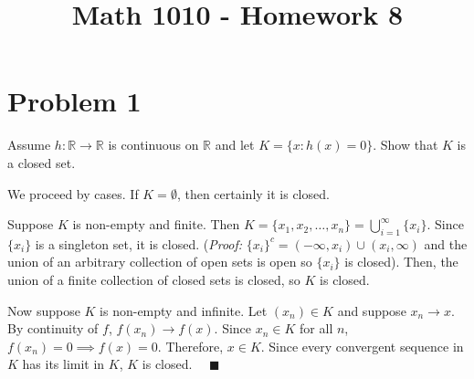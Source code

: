 \documentclass[12pt]{article}
\title{Math 1010 - Homework 8}
\author{}
\date{}
\newcommand{\qed}{\quad \blacksquare}
\begin{document}
\maketitle
\vspace*{-1in}

\section*{Problem 1 }
Assume $h:\mathbb{R}\to\mathbb{R}$ is continuous on $\mathbb{R}$ and let $K=\{x:h(x)=0 \}$. Show that $K$ is a closed set.

    \color{blue}
        We proceed by cases. If $K = \emptyset$, then certainly it is closed.

        Suppose $K$ is non-empty and finite. Then $K = \{x_1, x_2, \dots, x_n\} = \bigcup_{i =1}^{\infty} \{x_{i}\}$. Since $\{x_i\}$ is a singleton set, it is closed. (\emph{Proof:} $\{x_i\}^c = (-\infty, x_i) \cup (x_i, \infty)$ and the union of an arbitrary collection of open sets is open so $\{x_i\}$ is closed). Then, the union of a finite collection of closed sets is closed, so $K$ is closed. 
        
        Now suppose $K$ is non-empty and infinite. Let $(x_n) \in K$ and suppose $x_n \to x$. By continuity of $f$, $f(x_n) \to f(x)$. Since $x_n \in K$ for all $n$, $f(x_n) = 0 \implies f(x) = 0$. Therefore, $x \in K$. Since every convergent sequence in $K$ has its limit in $K$, $K$ is closed. $\qed$
    \color{black}

\pagebreak
\end{document}
